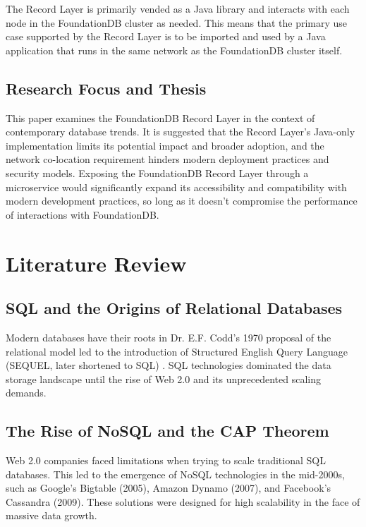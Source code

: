 \documentclass[sigconf]{acmart}
\begin{document}
The Record Layer is primarily vended as a Java library \cite{FDBRecordGithub} and interacts with each node in the FoundationDB cluster as needed. This means that the primary use case supported by the Record Layer is to be imported and used by a Java application that runs in the same network as the FoundationDB cluster itself.

\subsection{Research Focus and Thesis}
This paper examines the FoundationDB Record Layer in the context of contemporary database trends. It is suggested that the Record Layer's Java-only implementation limits its potential impact and broader adoption, and the network co-location requirement hinders modern deployment practices and security models. Exposing the FoundationDB Record Layer through a microservice would significantly expand its accessibility and compatibility with modern development practices, so long as it doesn't compromise the performance of interactions with FoundationDB.

\section{Literature Review}

\subsection{SQL and the Origins of Relational Databases}

Modern databases have their roots in Dr. E.F. Codd's 1970 proposal of the relational model \cite{CoddTheory}  led to the introduction of Structured English Query Language (SEQUEL, later shortened to SQL) \cite{SEQUEL}. SQL technologies dominated the data storage landscape until the rise of Web 2.0 and its unprecedented scaling demands.

\subsection{The Rise of NoSQL and the CAP Theorem}

Web 2.0 companies faced limitations when trying to scale traditional SQL databases. This led to the emergence of NoSQL technologies in the mid-2000s, such as Google's Bigtable (2005)\cite{BigTable}, Amazon Dynamo (2007)\cite{Dynamo}, and Facebook's Cassandra (2009)\cite{Cassandra}. These solutions were designed for high scalability in the face of massive data growth.
\end{document}
